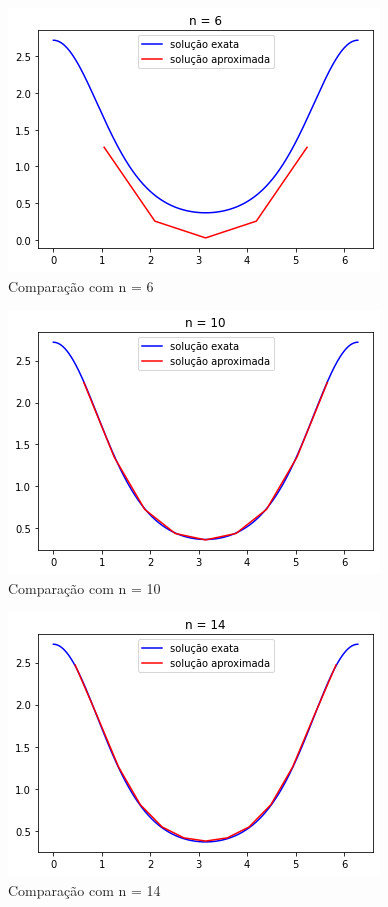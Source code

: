 \documentclass[pdftex, 12pt, a4paper]{report}
\begin{document}
\begin{figure}[ht]
    \centering
    \includegraphics[scale = 0.8]{n=6.png}
    \caption{Comparação com n = 6}
    \label{fig:my_label}
\end{figure}

\begin{figure}[ht]
    \centering
    \includegraphics[scale = 0.8]{n=10.png}
    \caption{Comparação com n = 10}
    \label{fig:my_label}
\end{figure}

\begin{figure}[ht]
    \centering
    \includegraphics[scale = 0.8]{n=14.png}
    \caption{Comparação com n = 14}
    \label{fig:my_label}
\end{figure}
\end{document}
